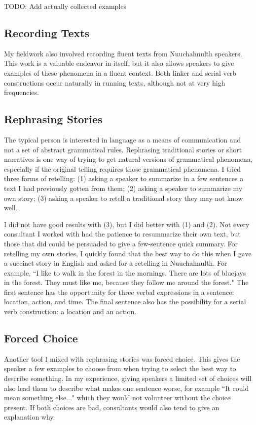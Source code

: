 TODO: Add actually collected examples

\subsection{Recording Texts}

My fieldwork also involved recording fluent texts from Nuuchahnulth speakers. This work is a valuable endeavor in itself, but it also allows speakers to give examples of these phenomena in a fluent context. Both linker and serial verb constructions occur naturally in running texts, although not at very high frequencies.

\subsection{Rephrasing Stories}

The typical person is interested in language as a means of communication and not a set of abstract grammatical rules. Rephrasing traditional stories or short narratives is one way of trying to get natural versions of grammatical phenomena, especially if the original telling requires those grammatical phenomena. I tried three forms of retelling: (1) asking a speaker to summarize in a few sentences a text I had previously gotten from them; (2) asking a speaker to summarize my own story; (3) asking a speaker to retell a traditional story they may not know well.

I did not have good results with (3), but I did better with (1) and (2). Not every consultant I worked with had the patience to resummarize their own text, but those that did could be persuaded to give a few-sentence quick summary. For retelling my own stories, I quickly found that the best way to do this when I gave a succinct story in English and asked for a retelling in Nuuchahnulth. For example, ``I like to walk in the forest in the mornings. There are lots of bluejays in the forest. They must like me, because they follow me around the forest." The first sentence has the opportunity for three verbal expressions in a sentence: location, action, and time. The final sentence also has the possibility for a serial verb construction: a location and an action.

\subsection{Forced Choice}

Another tool I mixed with rephrasing stories was forced choice. This gives the speaker a few examples to choose from when trying to select the best way to describe something. In my experience, giving speakers a limited set of choices will also lead them to describe what makes one sentence worse, for example ``It could mean something else..." which they would not volunteer without the choice present. If both choices are bad, consultants would also tend to give an explanation why.

